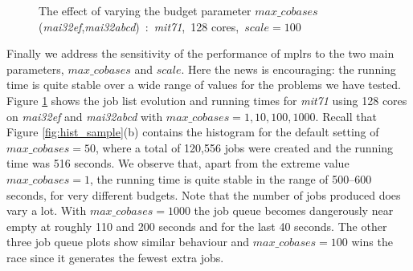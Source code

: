 \documentclass[a4paper,11pt]{article}   \usepackage{authblk} \usepackage[top=1.9cm,bottom=1.9cm,left=1.9cm,right=1.9cm]{geometry}
\newcommand{\progname}{\textsf}
\newcommand{\compname}{\emph}
\newcommand{\mplrs}{\progname{mplrs}\xspace}
\newcommand{\mainew}{\compname{mai32abcd}\xspace}
\newcommand{\maief}{\compname{mai32ef}\xspace}
\newcommand{\polytope}{\emph}
\newcommand{\mitseven}{\polytope{mit71}\xspace}
\newcommand{\maxcobases}{\ensuremath{\mathit{max\_cobases}}\xspace}
\newcommand{\myscale}{\ensuremath{\mathit{scale}}\xspace}
\begin{document}
\begin{figure}[htb]
\caption{The effect of varying the budget parameter $\maxcobases$ 
         (\maief,\mainew)~:~\mitseven,~128 cores,~$\myscale=100$} 
\label{fig:budget}
\end{figure}

Finally we address the sensitivity of the performance of \mplrs to the two
main parameters, \maxcobases and \myscale.
Here the news is encouraging: the running time is quite stable
over a wide range of values for the problems we have tested.
Figure \ref{fig:budget}
shows the job list evolution and running times for \mitseven using 128 cores
on \maief and \mainew with $\maxcobases=1,10,100,1000$.
Recall that  Figure \ref{fig:hist_sample}(b) contains
the histogram for the default setting of $\maxcobases=50$, where
a total of 120,556 jobs were created
and the running time was 516 seconds.
We observe that, apart from the extreme value $\maxcobases=1$, the running time is quite stable in
the range of 500--600 seconds, for very different budgets.
Note that the number of jobs produced does vary
a lot. With $\maxcobases=1000$ the job queue becomes dangerously near empty at roughly 110
and 200 seconds and for the last 40 seconds.
The other three job queue plots show similar behaviour and $\maxcobases=100$ wins the race
since it generates the fewest extra jobs.
\end{document}
